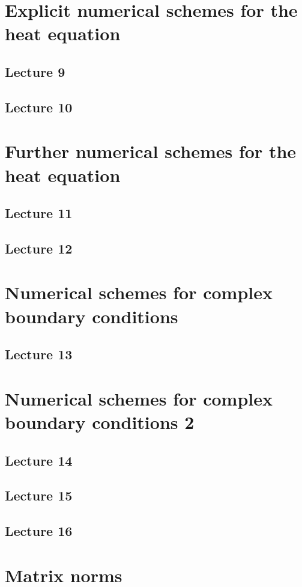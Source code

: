 \documentclass{article}
\begin{document}
\section{Explicit numerical schemes for the heat equation}
\subsection{Lecture 9}
\subsection{Lecture 10}


\section{Further numerical schemes for the heat equation}
\subsection{Lecture 11}
\subsection{Lecture 12}


\section{Numerical schemes for complex boundary conditions}
\subsection{Lecture 13}


\section{Numerical schemes for complex boundary conditions 2}
\subsection{Lecture 14}
\subsection{Lecture 15}
\subsection{Lecture 16}


\section{Matrix norms}
\end{document}
